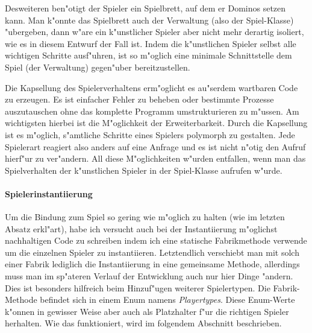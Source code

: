 Desweiteren ben"otigt der Spieler ein Spielbrett, auf dem er Dominos setzen kann. Man k"onnte das Spielbrett auch der Verwaltung (also der Spiel-Klasse) "ubergeben, dann w"are ein k"unstlicher Spieler aber nicht mehr derartig isoliert, wie es in diesem Entwurf der Fall ist. Indem die k"unstlichen Spieler selbst alle wichtigen Schritte ausf"uhren, ist so m"oglich eine minimale Schnittstelle dem Spiel (der Verwaltung) gegen"uber bereitzustellen. 

Die Kapsellung des Spielerverhaltens erm"oglicht es au"serdem wartbaren Code zu erzeugen. Es ist einfacher Fehler zu beheben oder bestimmte Prozesse auszutauschen ohne das komplette Programm umstrukturieren zu m"ussen. Am wichtigsten hierbei ist die M"oglichkeit der Erweiterbarkeit. Durch die Kapsellung ist es m"oglich, s"amtliche Schritte eines Spielers polymorph zu gestalten. Jede Spielerart reagiert also anders auf eine Anfrage und es ist nicht n"otig den Aufruf hierf"ur zu ver"andern. All diese M"oglichkeiten w"urden entfallen, wenn man das Spielverhalten der k"unstlichen Spieler in der Spiel-Klasse aufrufen w"urde.

\paragraph{Spielerinstantiierung}
Um die Bindung zum Spiel so gering wie m"oglich zu halten (wie im letzten Absatz erkl"art), habe ich versucht auch bei der Instantiierung m"oglichst nachhaltigen Code zu schreiben indem ich eine statische Fabrikmethode verwende um die einzelnen Spieler zu instantiieren. Letztendlich verschiebt man mit solch einer Fabrik lediglich die Instantiierung in eine gemeinsame Methode, allerdings muss man im sp"ateren Verlauf der Entwicklung auch nur hier Dinge "andern. Dies ist besonders hilfreich beim Hinzuf"ugen weiterer Spielertypen. Die Fabrik-Methode befindet sich in einem Enum namens \emph{Playertypes}. Diese Enum-Werte k"onnen in gewisser Weise aber auch als Platzhalter f"ur die \glqq richtigen\grqq {} Spieler herhalten. Wie das funktioniert, wird im folgendem Abschnitt beschrieben. 

